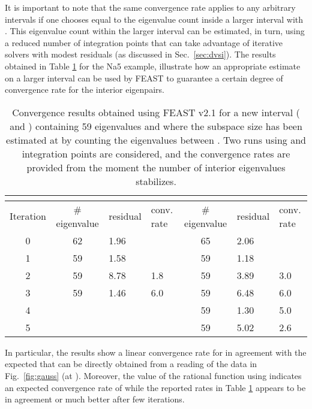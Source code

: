 \documentclass[12pt]{article}		\usepackage{tabls,multirow}
\begin{document}
It is important to note that the same convergence rate applies to any
arbitrary intervals  if one chooses  equal to the eigenvalue
count inside a larger interval  with
. This eigenvalue count within the larger interval
can be estimated, in turn, using a reduced number of integration
points that can take advantage of iterative solvers with modest
residuals (as discussed in Sec.~\ref{sec:dvsi}).  The results obtained
in Table \ref{tab:feastruns} for the Na5 example, illustrate how an
appropriate estimate on a larger interval can be used by FEAST to
guarantee a certain degree of convergence rate for the interior
eigenpairs.
\begin{table}[htbp]
\begin{center}
\begin{small}
\begin{tabular}{c|cll|cll}
   \multicolumn{1}{c}{}    & \multicolumn{3}{c}{} & \multicolumn{3}{c}{} \\ \hline\hline
Iteration     & \# eigenvalue & residual & conv. rate &  \# eigenvalue & residual & conv. rate  \\
0   &    62   &   1.96 &                    & 65 & 2.06 &  \\
1   &    59   &   1.58 &                    & 59 &1.18 &   \\
2   &    59   &   8.78 & 1.8  & 59 & 3.89 & 3.0   \\
3   &    59   &   1.46 & 6.0  & 59 & 6.48 & 6.0  \\
4    &         &            &                             & 59 &1.30 & 5.0   \\
5    &         &            &                             & 59 & 5.02 & 2.6    \\ \hline \hline
\end{tabular}
\end{small}
\caption{\label{tab:feastruns} Convergence results obtained using
  FEAST v2.1 for a new interval  ( and
  ) containing 59 eigenvalues and where the subspace size
  has been estimated at  by counting the eigenvalues between
  .  Two runs using  and 
  integration points are considered, and the convergence rates are
  provided from the moment the number of interior eigenvalues
  stabilizes.}
\end{center}
\end{table}
In particular, the results show a linear convergence rate for 
in agreement with the expected  that can be directly
obtained from a reading of the data in Fig.~\ref{fig:gauss} (at
).  Moreover, the value of the rational function using
 indicates an expected convergence rate of 
while the reported rates in Table \ref{tab:feastruns} appears to be in
agreement or much better after few iterations.
\end{document}
